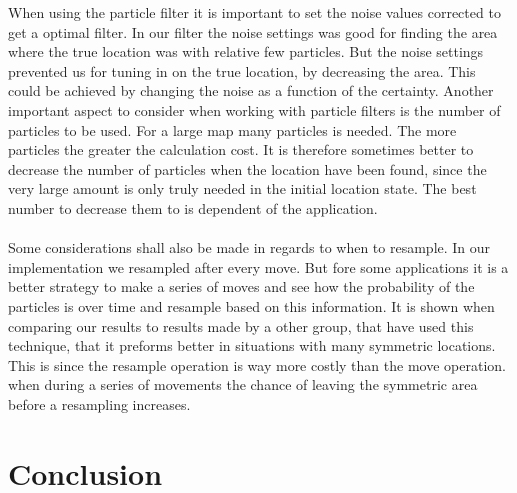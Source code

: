 When using the particle filter it is important to set the noise values corrected to get a optimal filter. In our filter the noise settings was good for finding the area where the true location was with relative few particles. But the noise settings prevented us for tuning in on the true location, by decreasing the area. This could be achieved by changing the noise as a function of the certainty.   
Another important aspect to consider when working with particle filters is the number of particles to be used. For a large map many particles is needed. The more particles the greater the calculation cost. It is therefore sometimes better to decrease the number of particles when the location have been found, since the very large amount is only truly needed in the initial location state. The best number to decrease them to is dependent of the application. \\\\
Some considerations shall also be made in regards to when to resample. In our implementation we resampled after every move. But fore some applications it is a better strategy to make a series of moves and see how the probability of the particles is over time and resample based on this information. It is shown when comparing our results to results made by a other group, that have used this technique, that it preforms better in situations with many symmetric locations. This is since the resample operation is way more costly than the move operation. when during a series of movements the chance of leaving the symmetric area before a resampling increases. 


\chapter{Conclusion}
